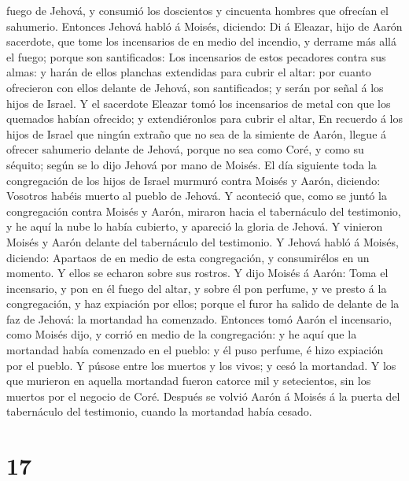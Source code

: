 fuego de Jehová, y consumió los doscientos y cincuenta hombres que
ofrecían el sahumerio.  Entonces Jehová habló á Moisés,
diciendo:  Di á Eleazar, hijo de Aarón sacerdote, que tome
los incensarios de en medio del incendio, y derrame más allá el fuego;
porque son santificados:  Los incensarios de estos
pecadores contra sus almas: y harán de ellos planchas extendidas para
cubrir el altar: por cuanto ofrecieron con ellos delante de Jehová, son
santificados; y serán por señal á los hijos de Israel.  Y
el sacerdote Eleazar tomó los incensarios de metal con que los quemados
habían ofrecido; y extendiéronlos para cubrir el altar,  En
recuerdo á los hijos de Israel que ningún extraño que no sea de la
simiente de Aarón, llegue á ofrecer sahumerio delante de Jehová, porque
no sea como Coré, y como su séquito; según se lo dijo Jehová por mano de
Moisés.  El día siguiente toda la congregación de los hijos
de Israel murmuró contra Moisés y Aarón, diciendo: Vosotros habéis
muerto al pueblo de Jehová.  Y aconteció que, como se juntó
la congregación contra Moisés y Aarón, miraron hacia el tabernáculo del
testimonio, y he aquí la nube lo había cubierto, y apareció la gloria de
Jehová.  Y vinieron Moisés y Aarón delante del tabernáculo
del testimonio.  Y Jehová habló á Moisés, diciendo:
 Apartaos de en medio de esta congregación, y consumirélos
en un momento. Y ellos se echaron sobre sus rostros.  Y
dijo Moisés á Aarón: Toma el incensario, y pon en él fuego del altar, y
sobre él pon perfume, y ve presto á la congregación, y haz expiación por
ellos; porque el furor ha salido de delante de la faz de Jehová: la
mortandad ha comenzado.  Entonces tomó Aarón el incensario,
como Moisés dijo, y corrió en medio de la congregación: y he aquí que la
mortandad había comenzado en el pueblo: y él puso perfume, é hizo
expiación por el pueblo.  Y púsose entre los muertos y los
vivos; y cesó la mortandad.  Y los que murieron en aquella
mortandad fueron catorce mil y setecientos, sin los muertos por el
negocio de Coré.  Después se volvió Aarón á Moisés á la
puerta del tabernáculo del testimonio, cuando la mortandad había cesado.

\hypertarget{section-16}{%
\section{17}\label{section-16}}


